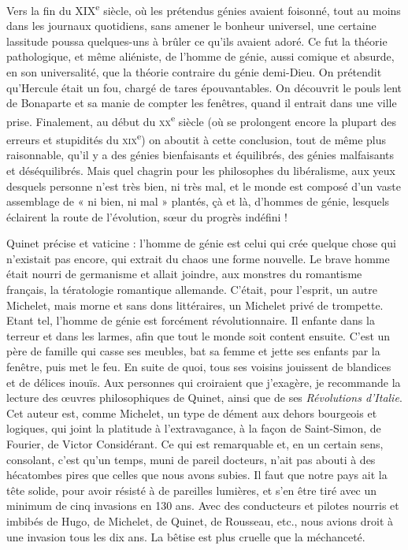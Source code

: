 \documentclass[french,twoside]{book} %
\begin{document}
Vers la fin du XIX\textsuperscript{e} siècle, où les prétendus génies avaient foisonné, tout au moins dans les journaux quotidiens, sans amener le bonheur universel, une certaine lassitude poussa quelques-uns à brûler ce qu’ils avaient adoré. Ce fut la théorie pathologique, et même aliéniste, de l’homme de génie, aussi comique et absurde, en son universalité, que la théorie contraire du génie demi-Dieu. On prétendit qu’Hercule était un fou, chargé de tares épouvantables. On découvrit le pouls lent de Bonaparte et sa manie de compter les fenêtres, quand il entrait dans une ville prise. Finalement, au début du \textsc{xx}\textsuperscript{e} siècle (où se prolongent encore la plupart des erreurs et stupidités du \textsc{xix}\textsuperscript{e}) on aboutit à cette conclusion, tout de même plus raisonnable, qu’il y a des génies bienfaisants et équilibrés, des génies malfaisants et déséquilibrés. Mais quel chagrin pour les philosophes du libéralisme, aux yeux desquels personne n’est très bien, ni très mal, et le monde est composé d’un vaste assemblage de « ni bien, ni mal » plantés, çà et là, d’hommes de génie, lesquels éclairent la route de l’évolution, sœur du progrès indéfini !\par
Quinet précise et vaticine : l’homme de génie est celui qui crée quelque chose qui n’existait pas encore, qui extrait du chaos une forme nouvelle. Le brave homme était nourri de germanisme et allait joindre, aux monstres du romantisme français, la tératologie romantique allemande. C’était, pour l’esprit, un autre Michelet, mais morne et sans dons littéraires, un Michelet privé de trompette. Etant tel, l’homme de génie est forcément révolutionnaire. Il enfante dans la terreur et dans les larmes, afin que tout le monde soit content ensuite. C’est un père de famille qui casse ses meubles, bat sa femme et jette ses enfants par la fenêtre, puis met le feu. En suite de quoi, tous ses voisins jouissent de blandices et de délices inouïs. Aux personnes qui croiraient que j’exagère, je recommande la lecture des œuvres philosophiques de Quinet, ainsi que de ses {\itshape Révolutions d’Italie}. Cet auteur est, comme Michelet, un type de dément aux dehors bourgeois et logiques, qui joint la platitude à l’extravagance, à la façon de Saint-Simon, de Fourier, de Victor Considérant. Ce qui est remarquable et, en un certain sens, consolant, c’est qu’un temps, muni de pareil docteurs, n’ait pas abouti à des hécatombes pires que celles que nous avons subies. Il faut que notre pays ait la tête solide, pour avoir résisté à de pareilles lumières, et s’en être tiré avec un minimum de cinq invasions en 130 ans. Avec des conducteurs et pilotes nourris et imbibés de Hugo, de Michelet, de Quinet, de Rousseau, etc., nous avions droit à une invasion tous les dix ans. La bêtise est plus cruelle que la méchanceté.\par
\end{document}
